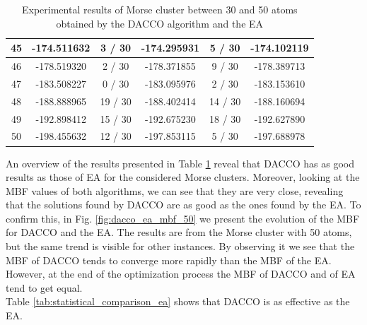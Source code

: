 \begin{table}[!htdp]
\begin{center}
\begin{tabular}{| c | c | c | c | c | c |}
						45 & -174.511632 & 3 / 30 & -174.295931 & 5 / 30 & -174.102119 \\ \hline
						46 & -178.519320 & 2 / 30 & -178.371855 & 9 / 30 & -178.389713 \\ \hline
						47 & -183.508227 & 0 / 30 & -183.095976 & 2 / 30 & -183.153610 \\ \hline
						48 & -188.888965 & 19 / 30 & -188.402414 & 14 / 30 & -188.160694 \\ \hline
						49 & -192.898412 & 15 / 30 & -192.675230 & 18 / 30 & -192.627890 \\ \hline
						50 & -198.455632 & 12 / 30 & -197.853115 & 5 / 30 & -197.688978 \\ \hline
					\end{tabular}
				\end{center}
				\caption{Experimental results of Morse cluster between 30 and 50 atoms obtained by the DACCO algorithm and the EA}
				\label{tab:dacco_vs_ea}
			\end{table}
			An overview of the results presented in Table \ref{tab:dacco_vs_ea} reveal that DACCO has as good results as those of EA for the considered Morse clusters. Moreover, looking at the MBF values of both algorithms, we can see that they are very close, revealing that the solutions found by DACCO are as good as the ones found by the EA. To confirm this, in Fig. \ref{fig:dacco_ea_mbf_50} we present the evolution of the MBF for DACCO and the EA. The results are from the Morse cluster with 50 atoms, but the same trend is visible for other instances. By observing it we see that the MBF of DACCO tends to converge more rapidly than the MBF of the EA. However, at the end of the optimization process the MBF of DACCO and of EA tend to get equal.\\
			Table \ref{tab:statistical_comparison_ea} shows that DACCO is as effective as the EA.
